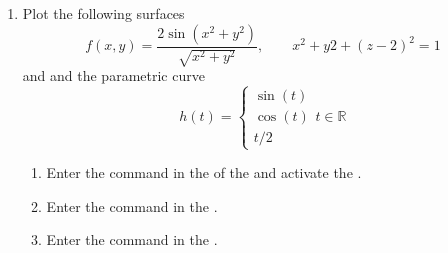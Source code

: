 \begin{enumerate}
\item Plot the following surfaces
      \[
      f(x,y)=\dfrac{2\sin(x^2+y^2)}{\sqrt{x^2+y^2}}, \qquad x^2+y 2+(z-2)^2=1
      \]
      and and the parametric curve
      \[
      h(t)=
      \begin{cases}
      \sin(t) \\
      \cos(t) \\
      t/2
      \end{cases}
      t\in \mathbb{R}
      \]
      \begin{indication}
      \begin{enumerate}
      \item Enter the command  in the  of the  and activate the .
      \item Enter the command   in the .
      \item Enter the command   in the .
      \end{enumerate}
      \end{indication}
\end{enumerate}